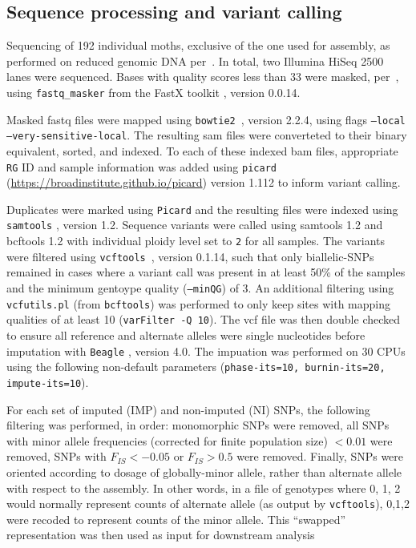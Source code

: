 \documentclass[fleqn,11pt]{wlpeerj}
\begin{document}
\subsection*{Sequence processing and variant calling} Sequencing of 192
individual moths, exclusive of the one used for assembly,  as performed on
reduced genomic DNA per~\cite{PARCHMAN:2012ca}. In total, two  Illumina HiSeq
2500 lanes were sequenced. Bases with quality scores less than 33 were masked,
per~\cite{Yun:2014dn},  using \texttt{fastq\_masker} from the FastX toolkit
\citep{citeulike:9103573}, version 0.0.14.

Masked fastq files were mapped using \texttt{bowtie2}~\cite{Langmead:2012jh},
version 2.2.4, using flags \texttt{--local --very-sensitive-local}.  The
resulting  sam files were converteted to their binary equivalent, sorted, and
indexed. To each of these indexed bam files, appropriate \texttt{RG} ID and
sample information was added using \texttt{picard} \\
(\url{https://broadinstitute.github.io/picard}) version 1.112 to inform variant
calling.

Duplicates were marked using \texttt{Picard} and the resulting files were
indexed using \texttt{samtools} \citep{Li:2009ka}, version 1.2.  Sequence
variants were called using samtools 1.2 and bcftools 1.2 \citep{Li:2009ka} with
individual  ploidy level set to \texttt{2} for all samples.  The variants were
filtered  using \texttt{vcftools}~\citep{Danecek:2011gz}, version 0.1.14, such
that only biallelic-SNPs remained in cases where a variant call was present in
at least 50\% of the samples and the minimum gentoype quality (\texttt{--minQG})
of 3. An additional filtering using \texttt{vcfutils.pl} (from
\texttt{bcftools}) was performed to only keep sites with mapping qualities of at
least 10 (\texttt{varFilter -Q 10}). The vcf file was then double checked to
ensure all reference and alternate alleles were single nucleotides before
imputation with \texttt{Beagle} \citep{Browning:2007ge}, version 4.0.  The
impuation was performed on 30 CPUs using the following non-default parameters
(\texttt{phase-its=10, burnin-its=20, impute-its=10}).

For each set of imputed (IMP) and non-imputed (NI) SNPs, the following filtering
was performed, in order: monomorphic SNPs were removed, all SNPs with minor
allele frequencies (corrected for finite population size) $< 0.01$ were removed,
SNPs with $F_{IS} < -0.05$ or $F_{IS} > 0.5$ were removed.  Finally, SNPs were
oriented  according to dosage of globally-minor allele, rather than alternate
allele  with respect to the assembly. In other words,  in a file of genotypes
where 0, 1, 2 would normally represent counts of alternate allele  (as output by
\texttt{vcftools}), 0,1,2 were recoded to represent counts of the  minor allele.
This ``swapped'' representation was then used as input for  downstream analysis
\end{document}
